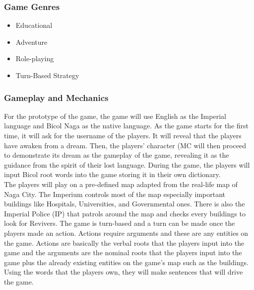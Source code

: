 \documentclass[11pt]{article}
\begin{document}
\subsubsection{Game Genres}
\begin{itemize}
\item
  Educational
\item
  Adventure
\item
  Role-playing
\item
  Turn-Based Strategy
\end{itemize}
  
\subsubsection{Gameplay and Mechanics}
For the prototype of the game, the game will use English as the Imperial language and Bicol Naga as the native language. As the game starts for the first time, it will ask for the username of the players. It will reveal that the players have awaken from a dream. Then, the players' character (MC will then proceed to demonstrate its dream as the gameplay of the game, revealing it as the guidance from the spirit of their lost language. During the game, the players will input Bicol root words into the game storing it in their own dictionary.\\
The players will play on a pre-defined map adapted from the real-life map of Naga City. The Imperium controls most of the map especially important buildings like Hospitals, Universities, and Governmental ones. There is also the Imperial Police (IP) that patrols around the map and checks every buildings to look for Revivers. The game is turn-based and a turn can be made once the players made an action. Actions require arguments and these are any entities on the game. Actions are basically the verbal roots that the players input into the game and the arguments are the nominal roots that the players input into the game plus the already existing entities on the game's map such as the buildings. Using the words that the players own, they will make sentences that will drive the game.
\end{document}
